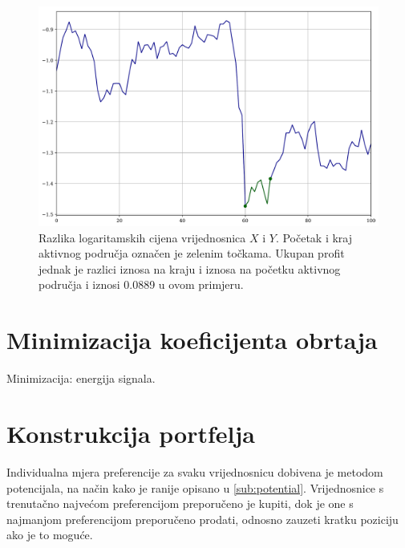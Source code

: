 \documentclass[lmodern, utf8, diplomski, numeric]{fer}
\begin{document}
  \begin{figure}[p]
    \centering
    \includegraphics[width=\linewidth]{graphics/trading-diffs.pdf}
    \caption{Razlika logaritamskih cijena vrijednosnica $X$ i $Y$. Početak i kraj aktivnog područja označen je zelenim točkama. Ukupan profit jednak je razlici iznosa na kraju i iznosa na početku aktivnog područja i iznosi 0.0889 u ovom primjeru.}
    \label{fig:trading-diffs}
  \end{figure}

  \section{Minimizacija koeficijenta obrtaja} 
  Minimizacija: energija signala.
  
  \section{Konstrukcija portfelja}
  Individualna mjera preferencije za svaku vrijednosnicu dobivena je metodom potencijala, na način kako je ranije opisano u \ref{sub:potential}.
  Vrijednosnice s trenutačno najvećom preferencijom preporučeno je kupiti, dok je one s najmanjom preferencijom preporučeno prodati, odnosno zauzeti kratku poziciju ako je to moguće.
  
\end{document}
